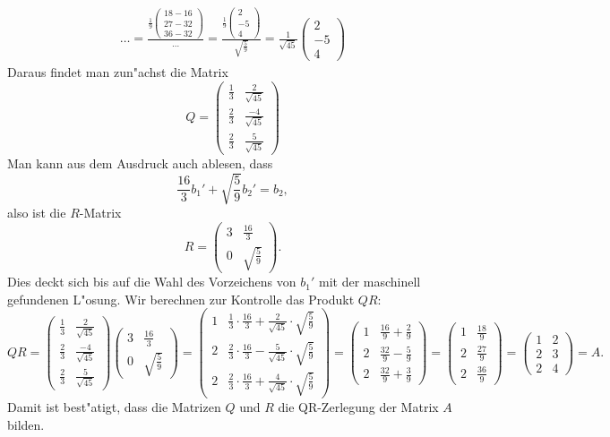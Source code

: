 \begin{loesung}
\begin{align*}
{}{\dots}
=\frac{\displaystyle\frac19\begin{pmatrix}18-16\\27-32\\36-32\end{pmatrix}}{\dots}
=\frac{\displaystyle\frac19\begin{pmatrix}2\\-5\\4\end{pmatrix}}{\sqrt{\frac{5}{9}}}
=\frac1{\sqrt{45}}\begin{pmatrix}2\\-5\\4\end{pmatrix}
\end{align*}
Daraus findet man zun"achst die Matrix 
\[
Q
=
\begin{pmatrix}
\frac13&\frac{ 2}{\sqrt{45}}\\
\frac23&\frac{-4}{\sqrt{45}}\\
\frac23&\frac{ 5}{\sqrt{45}}
\end{pmatrix}
\]
Man kann aus dem Ausdruck auch ablesen, dass
\[
\frac{16}{3}b_1'+\sqrt{\frac{5}{9}}b_2'=b_2,
\]
also ist die $R$-Matrix
\[
R
=
\begin{pmatrix}
3&\frac{16}{3}\\
0&\sqrt{\frac{5}{9}}
\end{pmatrix}.
\]
Dies deckt sich bis auf die Wahl des Vorzeichens von $b_1'$ mit der
maschinell gefundenen L"osung.
Wir berechnen zur Kontrolle das Produkt $QR$:
\[
QR=
\begin{pmatrix}
\frac13&\frac{ 2}{\sqrt{45}}\\
\frac23&\frac{-4}{\sqrt{45}}\\
\frac23&\frac{ 5}{\sqrt{45}}
\end{pmatrix}
\begin{pmatrix}
3&\frac{16}{3}\\
0&\sqrt{\frac{5}{9}}
\end{pmatrix}
=
\begin{pmatrix}
1&\frac13\cdot \frac{16}{3}+\frac{2}{\sqrt{45}}\cdot\sqrt{\frac{5}{9}}\\
2&\frac23\cdot \frac{16}{3}-\frac{5}{\sqrt{45}}\cdot\sqrt{\frac{5}{9}}\\
2&\frac23\cdot \frac{16}{3}+\frac{4}{\sqrt{45}}\cdot\sqrt{\frac{5}{9}}
\end{pmatrix}
=
\begin{pmatrix}
1&\frac{16}{9}+\frac{2}{9}\\
2&\frac{32}{9}-\frac{5}{9}\\
2&\frac{32}{9}+\frac{3}{9}
\end{pmatrix}
=
\begin{pmatrix}
1&\frac{18}{9}\\
2&\frac{27}{9}\\
2&\frac{36}{9}
\end{pmatrix}
=
\begin{pmatrix}
1&2\\
2&3\\
2&4
\end{pmatrix}
=A.
\]
Damit ist best"atigt, dass die Matrizen $Q$ und $R$ die QR-Zerlegung der
Matrix $A$ bilden.
\end{loesung}


